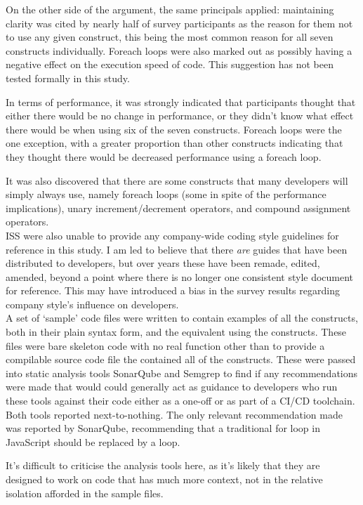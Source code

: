 \documentclass{article}
\begin{document}
            On the other side of the argument, the same principals applied: maintaining clarity was cited by nearly half of survey participants as the reason for them not to use any given construct, this being the most common reason for all seven constructs individually. Foreach loops were also marked out as possibly having a negative effect on the execution speed of code. This suggestion has not been tested formally in this study.

            In terms of performance, it was strongly indicated that participants thought that either there would be no change in performance, or they didn't know what effect there would be when using six of the seven constructs. Foreach loops were the one exception, with a greater proportion than other constructs indicating that they thought there would be decreased performance using a foreach loop.

            It was also discovered that there are some constructs that many developers will simply always use, namely foreach loops (some in spite of the performance implications), unary increment/decrement operators, and compound assignment operators.
            \\
            ISS were also unable to provide any company-wide coding style guidelines for reference in this study. I am led to believe that there \emph{are} guides that have been distributed to developers, but over years these have been remade, edited, amended, beyond a point where there is no longer one consistent style document for reference. This may have introduced a bias in the survey results regarding company style's influence on developers.
            \\

            A set of `sample' code files were written to contain examples of all the constructs, both in their plain syntax form, and the equivalent using the constructs. These files were bare skeleton code with no real function other than to provide a compilable source code file the contained all of the constructs. These were passed into static analysis tools SonarQube and Semgrep to find if any recommendations were made that would could generally act as guidance to developers who run these tools against their code either as a one-off or as part of a CI/CD toolchain. Both tools reported next-to-nothing. The only relevant recommendation made was reported by SonarQube, recommending that a traditional for loop in JavaScript should be replaced by a  loop.

            It's difficult to criticise the analysis tools here, as it's likely that they are designed to work on code that has much more context, not in the relative isolation afforded in the sample files.
\end{document}
